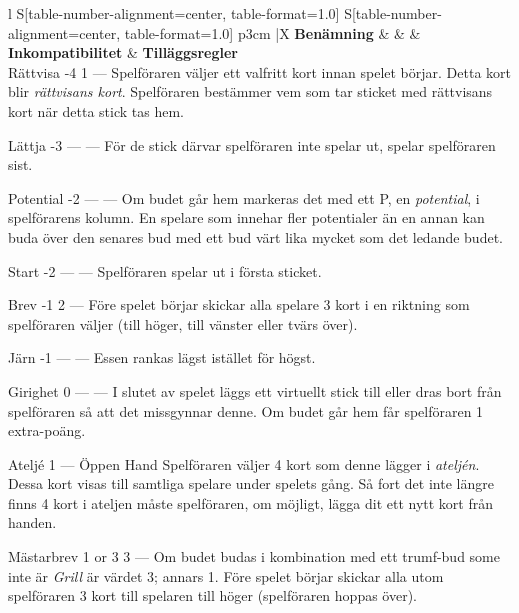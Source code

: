 	\begin{center}
		\begin{tabularx}{\textwidth}{
			l
			S[table-number-alignment=center, table-format=1.0]
			S[table-number-alignment=center, table-format=1.0]
			p{3cm}
			|X
		}
			\textbf{Benämning} &
			 &
			 &
			\textbf{Inkompatibilitet} &
			\textbf{Tilläggsregler}
			\\[-3ex]

			\specialBidItem%
			{Rättvisa}
			{-4}
			{1}
			{---}
			{%
				Spelföraren väljer ett valfritt kort innan spelet börjar. Detta kort blir \emph{rättvisans kort}. Spelföraren bestämmer vem som tar sticket med rättvisans kort när detta stick tas hem.
			}

			\specialBidItem%
			{Lättja}
			{-3}
			{{---}}
			{---}
			{%
				För de stick därvar spelföraren inte spelar ut, spelar spelföraren sist.
			}

			\specialBidItem%
			{Potential}
			{-2}
			{{---}}
			{---}
			{%
				Om budet går hem markeras det med ett P, en \emph{potential}, i spelförarens kolumn. En spelare som innehar fler potentialer än en annan kan buda över den senares bud med ett bud värt lika mycket som det ledande budet.
			}

			\specialBidItem%
			{Start}
			{-2}
			{{---}}
			{---}
			{%
				Spelföraren spelar ut i första sticket.
			}

			\specialBidItem%
			{Brev}
			{-1}
			{2}
			{---}
			{%
				Före spelet börjar skickar alla spelare 3 kort i en riktning som spelföraren väljer (till höger, till vänster eller tvärs över).
			}

			\specialBidItem%
			{Järn}
			{-1}
			{{---}}
			{---}
			{%
				Essen rankas lägst istället för högst.
			}

			\specialBidItem%
			{Girighet}
			{0}
			{{---}}
			{---}
			{%
				I slutet av spelet läggs ett virtuellt stick till eller dras bort från spelföraren så att det missgynnar denne. Om budet går hem får spelföraren 1 extra-poäng.
			}

			\specialBidItem%
			{Ateljé}
			{1}
			{{---}}
			{Öppen Hand}
			{%
				Spelföraren väljer 4 kort som denne lägger i \emph{ateljén}. Dessa kort visas till samtliga spelare under spelets gång. Så fort det inte längre finns 4 kort i ateljen måste spelföraren, om möjligt, lägga dit ett nytt kort från handen.
			}

			\specialBidItem%
			{Mästarbrev}
			{{1 or 3}}
			{3}
			{---}
			{%
				Om budet budas i kombination med ett trumf-bud some inte är \emph{Grill} är värdet 3; annars 1. Före spelet börjar skickar alla utom spelföraren 3 kort till spelaren till höger (spelföraren hoppas över).
			}


\end{tabularx}
\end{center}
